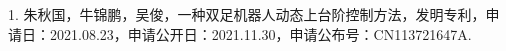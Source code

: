 \cleardoublepage
{}


\cleardoublepage
{}
1. 朱秋国，牛锦鹏，吴俊，一种双足机器人动态上台阶控制方法，发明专利，申请日：2021.08.23，申请公开日：2021.11.30，申请公布号：CN113721647A.